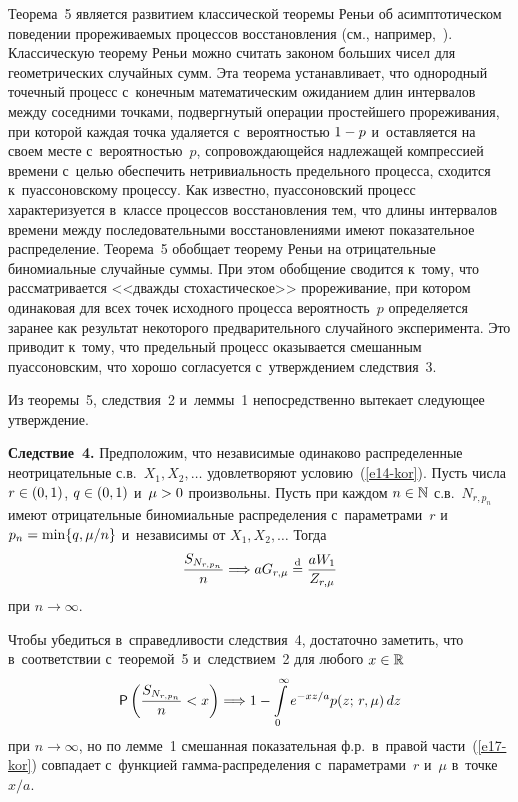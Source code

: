 \begin{multicols}{2}
Теорема~5 является развитием классической тео\-ре\-мы Реньи об
асимптотическом поведении прореживаемых процессов восстановления
(см., например,~\cite{GnedenkoKorolev1996}). Классическую теорему
Реньи можно считать законом больших чисел для геометрических
случайных сумм. Эта теорема устанавливает, что однородный точечный
процесс с~конечным математическим ожиданием длин интервалов между
соседними точками, подвергнутый операции прос\-тей\-ше\-го прореживания,
при которой каждая точка удаляется с~вероятностью $1\hm-p$ 
и~оставляется на своем месте с~вероятностью~$p$, сопровождающейся
надлежащей компрессией времени с~целью обеспечить нетривиальность
предельного процесса, сходится к~пуассоновскому процессу. Как
известно, пуассоновский процесс характеризуется в~классе процессов
восстановления тем, что длины интервалов времени между
последовательными восстановлениями имеют показательное
распределение. Теорема~5 обобщает теорему Реньи на отрицательные
биномиальные случайные суммы. При этом обобщение сводится к~тому,
что рассматривается <<дважды стохастическое>> прореживание, при
котором одинаковая для всех точек исходного процесса вероятность~$p$
определяется заранее как результат некоторого предварительного
случайного эксперимента. Это приводит к~тому, что предельный процесс
оказывается смешанным пуассоновским, что хорошо согласуется 
с~утверждением следствия~3.

Из теоремы~5, следствия~2 и~леммы~1 непосредственно вытекает
следующее утверждение.

\smallskip

\noindent
\textbf{Следствие~4.} Предположим, что независимые одинаково
распределенные неотрицательные с.в.\ $X_1,X_2,\ldots$ удовлетворяют
условию~(\ref{e14-kor}). Пусть чис\-ла $r\hm\in(0,1)$, $q\hm\in(0,1)$ и~$\mu\hm>0$
произвольны. Пусть при каждом $n\hm\in\mathbb{N}$ с.в.~$N_{r,p_n}$
имеют отрицательные биномиальные распределения с~параметрами~$r$ 
и~$p_n\hm=\min\{q,\mu/n\}$ и~независимы от $X_1,X_2,\ldots$ \mbox{Тогда}
\begin{equation}
\displaystyle\frac{\displaystyle S_{N_{r,p_n}}\mathstrut}{\displaystyle n\mathstrut}\Longrightarrow
aG_{r,\mu}\stackrel{\mathrm{d}}{=}\displaystyle\frac{\displaystyle aW_1\mathstrut}{\displaystyle Z_{r,\mu}\mathstrut}
\label{e16-kor}
\end{equation}
при $n\to\infty$.

\smallskip

Чтобы убедиться в~справедливости следствия~4, достаточно заметить,
что в~соответствии с~теоремой~5 и~следствием~2 для любого
$x\hm\in\mathbb{R}$ 
\begin{equation}
{\sf P}\left(\displaystyle\frac{\displaystyle S_{N_{r,p_n}}\mathstrut}{\displaystyle n\mathstrut}<x\right)\Longrightarrow
1-\int\limits_{0}^{\infty}e^{-xz/a}p(z;\,r,\mu)\,dz
 \label{e17-kor}
\end{equation}
при $n\to\infty$, но по лемме~1 смешанная показательная ф.р.\ 
в~правой части~(\ref{e17-kor}) совпадает с~функцией гам\-ма-рас\-пре\-де\-ле\-ния 
с~параметрами~$r$ и~$\mu$ в~точке~$x/a$.


\end{multicols}
